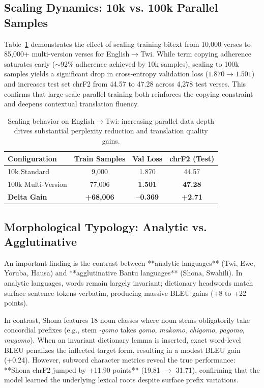 \documentclass[10pt,twocolumn]{article}
\begin{document}
\subsection{Scaling Dynamics: 10k vs. 100k Parallel Samples}
Table~\ref{tab:scaling} demonstrates the effect of scaling training bitext from 10,000 verses to 85,000+ multi-version verses for English$\rightarrow$Twi. While term copying adherence saturates early ($\sim$92\% adherence achieved by 10k samples), scaling to 100k samples yields a significant drop in cross-entropy validation loss ($1.870 \rightarrow 1.501$) and increases test set chrF2 from 44.57 to 47.28 across 4,278 test verses. This confirms that large-scale parallel training both reinforces the copying constraint and deepens contextual translation fluency.

\begin{table}[t]
\centering
\small
\begin{tabular}{lccc}
\toprule
\textbf{Configuration} & \textbf{Train Samples} & \textbf{Val Loss} & \textbf{chrF2 (Test)} \\
\midrule
10k Standard & 9,000 & 1.870 & 44.57 \\
100k Multi-Version & 77,006 & \textbf{1.501} & \textbf{47.28} \\
\midrule
\textbf{Delta Gain} & \textbf{+68,006} & \textbf{--0.369} & \textbf{+2.71} \\
\bottomrule
\end{tabular}
\caption{Scaling behavior on English$\rightarrow$Twi: increasing parallel data depth drives substantial perplexity reduction and translation quality gains.}
\label{tab:scaling}
\end{table}

\subsection{Morphological Typology: Analytic vs. Agglutinative}
An important finding is the contrast between **analytic languages** (Twi, Ewe, Yoruba, Hausa) and **agglutinative Bantu languages** (Shona, Swahili). In analytic languages, words remain largely invariant; dictionary headwords match surface sentence tokens verbatim, producing massive BLEU gains (+8 to +22 points).

In contrast, Shona features 18 noun classes where noun stems obligatorily take concordial prefixes (e.g., stem \emph{-gomo} takes \emph{gomo}, \emph{makomo}, \emph{chigomo}, \emph{pagomo}, \emph{mugomo}). When an invariant dictionary lemma is inserted, exact word-level BLEU penalizes the inflected target form, resulting in a modest BLEU gain (+0.24). However, subword character metrics reveal the true performance: **Shona chrF2 jumped by +11.90 points** (19.81 $\rightarrow$ 31.71), confirming that the model learned the underlying lexical roots despite surface prefix variations.
\end{document}
